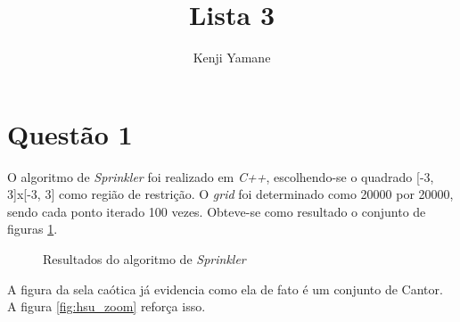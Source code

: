 \documentclass{article}[twocolumn]
\title{Lista 3}
\author{Kenji Yamane}
\begin{document}
	\maketitle
	\section{Quest\~ao 1}
	O algoritmo de \textit{Sprinkler} foi realizado em \textit{C++},
	escolhendo-se o quadrado [-3, 3]x[-3, 3] como regi\~ao de restri\c{c}\~ao. O \textit{grid}
	foi determinado como 20000 por 20000, sendo cada ponto iterado 100 vezes. Obteve-se
	como resultado o conjunto de figuras \ref{fig:sprinkler_results}.
	\begin{figure}[H]
		\centering
		\caption{Resultados do algoritmo de \textit{Sprinkler}}
		\label{fig:sprinkler_results}
	\end{figure}
	A figura da sela ca\'otica j\'a evidencia como ela de fato \'e um conjunto de Cantor.
	A figura \ref{fig:hsu_zoom} refor\c{c}a isso.
\end{document}
